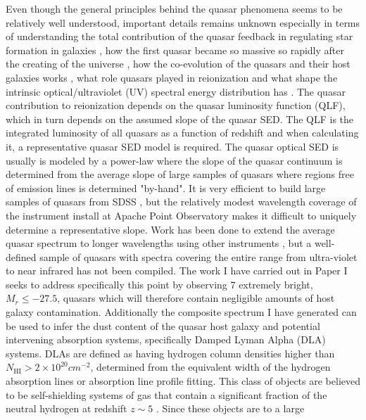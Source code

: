 Even though the general principles behind the quasar phenomena seems to be
relatively well understood, important details remains unknown especially in
terms of
understanding the total contribution of the quasar feedback in
regulating star
formation in galaxies \citep{DiMatteo2005}, how the first quasar
became so
massive so rapidly after the creating of the universe \citep{Wu2015a},
how the
co-evolution of the quasars and their host galaxies works
\citep{Ferrarese2000},
what role quasars played in reionization
\citep{Hopkins2007} and what shape the intrinsic optical/ultraviolet (UV)
spectral energy distribution has \citep{Krawczyk2015}. The quasar contribution
to
reionization depends on the quasar luminosity function (QLF), which in turn
depends on the assumed slope of the quasar SED. The QLF is the integrated
luminosity of all quasars as a function of redshift and when calculating it, a
representative quasar SED model is required. The quasar optical SED is usually
is modeled by a power-law where the slope of the quasar continuum is determined
from the average slope of large samples of quasars \citep{Vandenberk2001,
Richards2006a, Shen2011, Lusso2015} where regions free of emission lines is
determined "by-hand". It is very efficient to build large samples of quasars
from SDSS \citep{Paris2014}, but the relatively modest wavelength coverage of
the instrument install at Apache Point Observatory \citep{Gunn2006} makes it
difficult to uniquely determine a representative slope. Work has been done to
extend the average quasar spectrum to longer wavelengths using other instruments
\citep{Glikman2006}, but a well-defined sample of quasars with spectra covering
the entire range from ultra-violet to near infrared has not been compiled.
The
work I have carried out in Paper I seeks to address specifically this point
by
observing 7 extremely bright, $M_{r} \leq -27.5$, quasars which will
therefore
contain negligible amounts of host galaxy contamination. Additionally
the
composite spectrum I have generated can be used to infer the dust content of
the
quasar host galaxy and potential intervening absorption systems,
specifically
Damped Lyman Alpha (DLA) systems. DLAs are defined as having
hydrogen column
densities higher than $N_{\mathrm{HI}} > 2 \times 10^{20}
cm^{-2}$, determined
from the equivalent width of the hydrogen absorption lines or absorption line
profile fitting.
This class of objects are believed to be self-shielding systems
of gas that
contain a significant fraction of the neutral hydrogen at redshift
$z \sim 5$
\citep{StorrieLombardi2000}. Since these objects are to a large
